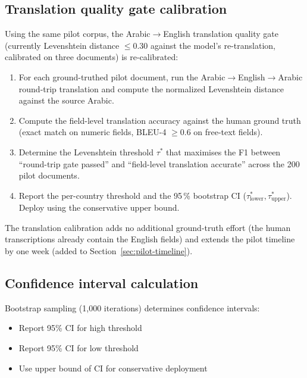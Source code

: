 \subsection{Translation quality gate calibration}
\label{sec:pilot-translation}

Using the same pilot corpus, the Arabic$\to$English translation
quality gate (currently Levenshtein distance $\le$0.30 against the
model's re-translation, calibrated on three documents) is
re-calibrated:

\begin{enumerate}
  \item For each ground-truthed pilot document, run the
        Arabic$\to$English$\to$Arabic round-trip translation and
        compute the normalized Levenshtein distance against the
        source Arabic.
  \item Compute the field-level translation accuracy against the
        human ground truth (exact match on numeric fields, BLEU-4
        $\ge$0.6 on free-text fields).
  \item Determine the Levenshtein threshold $\tau^{*}$ that
        maximises the F1 between ``round-trip gate passed'' and
        ``field-level translation accurate'' across the 200 pilot
        documents.
  \item Report the per-country threshold and the 95\,\% bootstrap
        CI ($\tau^{*}_{\mathrm{lower}}, \tau^{*}_{\mathrm{upper}}$).
        Deploy using the conservative upper bound.
\end{enumerate}

\noindent
The translation calibration adds no additional ground-truth effort
(the human transcriptions already contain the English fields) and
extends the pilot timeline by one week (added to
Section~\ref{sec:pilot-timeline}).

\subsection{Confidence interval calculation}

Bootstrap sampling (1,000 iterations) determines confidence intervals:
\begin{itemize}
  \item Report 95\% CI for high threshold
  \item Report 95\% CI for low threshold
  \item Use upper bound of CI for conservative deployment
\end{itemize}

